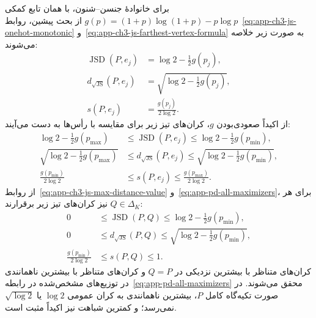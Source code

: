 برای خانوادهٔ جنسن--شنون، با همان تابع کمکی
$g(p)=(1+p)\log(1+p)-p\log p$ از بحث پیشین،
روابط~\eqref{eq:app-ch3-js-onehot-monotonic}
و~\eqref{eq:app-ch3-js-farthest-vertex-formula}
به صورت زیر خلاصه می‌شوند:
\begin{equation}\label{cmp:eq:ch3-js-family-vertex-values}
\begin{aligned}
\operatorname{JSD}(P,e_j)&=\log2-\tfrac12 g(p_j),\\
d_{\sqrt{\mathrm{JS}}}(P,e_j)&=\sqrt{\log2-\tfrac12 g(p_j)},\\
s(P,e_j)&=\frac{g(p_j)}{2\log2}.
\end{aligned}
\end{equation}
از اکیداً صعودی‌بودن $g$، کران‌های تیز زیر برای
مقایسه با رأس‌ها به دست می‌آیند:
\begin{equation}\label{cmp:eq:ch3-js-family-vertex-bounds}
\begin{aligned}
\log2-\tfrac12g(p_{\max})
&\le\operatorname{JSD}(P,e_j)
\le\log2-\tfrac12g(p_{\min}),\\
\sqrt{\log2-\tfrac12g(p_{\max})}
&\le d_{\sqrt{\mathrm{JS}}}(P,e_j)
\le\sqrt{\log2-\tfrac12g(p_{\min})},\\
\frac{g(p_{\min})}{2\log2}
&\le s(P,e_j)\le\frac{g(p_{\max})}{2\log2}.
\end{aligned}
\end{equation}
از روابط~\eqref{eq:app-ch3-js-max-distance-value}
و~\eqref{eq:app-pd-all-maximizers}، برای هر
$Q\in\Delta_K$ نیز کران‌های تیز زیر برقرارند:
\begin{equation}\label{cmp:eq:ch3-js-family-fixed-distribution-bounds}
\begin{aligned}
0&\le\operatorname{JSD}(P,Q)
\le\log2-\tfrac12g(p_{\min}),\\
0&\le d_{\sqrt{\mathrm{JS}}}(P,Q)
\le\sqrt{\log2-\tfrac12g(p_{\min})},\\
\frac{g(p_{\min})}{2\log2}&\le s(P,Q)\le1.
\end{aligned}
\end{equation}
کران‌های متناظر با بیشترین نزدیکی در $Q=P$ و
کران‌های متناظر با بیشترین ناهمانندی در توزیع‌های
مشخص‌شده در رابطه~\eqref{eq:app-pd-all-maximizers}
محقق می‌شوند. در صورت تکیه‌گاه کامل $P$، بیشترین
ناهمانندی به کران عمومی $\log2$ یا $\sqrt{\log2}$
نمی‌رسد؛ و کمترین شباهت نیز اکیداً مثبت است.

